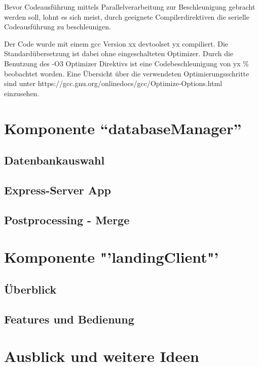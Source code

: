 \documentclass[10pt,a4paper]{report}
\begin{document}
Bevor Codeausführung mittels Parallelverarbeitung zur Beschleunigung gebracht werden soll, lohnt es sich meist, durch geeignete Compilerdirektiven die serielle Codeausführung zu beschleunigen.

Der Code wurde mit einem gcc Version xx devtoolset yx compiliert. Die Standardübersetzung ist dabei ohne eingeschalteten Optimizer. 
Durch die Benutzung des -O3 Optimizer Direktivs ist eine Codebeschleunigung von yx \% beobachtet worden. 
Eine Übersicht über die verwendeten Optimierungsschritte sind unter https://gcc.gnu.org/onlinedocs/gcc/Optimize-Options.html einzusehen.

\chapter{Komponente "`databaseManager"'}
\section{Datenbankauswahl}
\section{Express-Server App}
\section{Postprocessing - Merge}

\chapter{Komponente "'landingClient"'}
\section{Überblick}
\section{Features und Bedienung}
  
\chapter{Ausblick und weitere Ideen}
\end{document}
